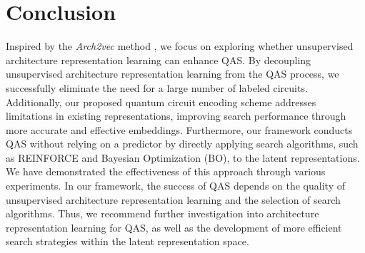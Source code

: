 \documentclass{article} %
\begin{document}

\section{Conclusion}
Inspired by the \textit{Arch2vec} method \citep{yan2020does}, we focus on exploring whether unsupervised architecture representation learning can enhance QAS. By decoupling unsupervised architecture representation learning from the QAS process, we successfully eliminate the need for a large number of labeled circuits. Additionally, our proposed quantum circuit encoding scheme addresses limitations in existing representations, improving search performance through more accurate and effective embeddings. Furthermore, our framework conducts QAS without relying on a predictor by directly applying search algorithms, such as REINFORCE and Bayesian Optimization (BO), to the latent representations. We have demonstrated the effectiveness of this approach through various experiments. In our framework, the success of QAS depends on the quality of unsupervised architecture representation learning and the selection of search algorithms. Thus, we recommend further investigation into architecture representation learning for QAS, as well as the development of more efficient search strategies within the latent representation space.

\end{document}
